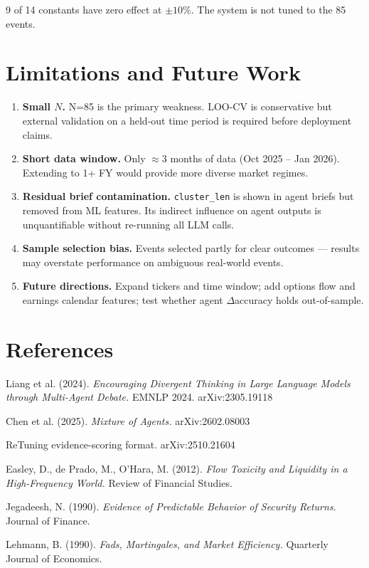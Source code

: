 \documentclass[11pt, a4paper]{article}
\begin{document}
9 of 14 constants have zero effect at $\pm10\%$. The system is not tuned to the 85 events.

\section{Limitations and Future Work}

\begin{enumerate}[leftmargin=1.5em, itemsep=3pt]
    \item \textbf{Small $N$.} N=85 is the primary weakness. LOO-CV is conservative but external validation on a held-out time period is required before deployment claims.
    \item \textbf{Short data window.} Only $\approx$3 months of data (Oct 2025 -- Jan 2026). Extending to 1+ FY would provide more diverse market regimes.
    \item \textbf{Residual brief contamination.} \texttt{cluster\_len} is shown in agent briefs but removed from ML features. Its indirect influence on agent outputs is unquantifiable without re-running all LLM calls.
    \item \textbf{Sample selection bias.} Events selected partly for clear outcomes — results may overstate performance on ambiguous real-world events.
    \item \textbf{Future directions.} Expand tickers and time window; add options flow and earnings calendar features; test whether agent $\Delta$accuracy holds out-of-sample.
\end{enumerate}

\section*{References}

\begin{enumerate}[leftmargin=1.5em, itemsep=3pt, label={[\arabic*]}]
    \item Liang et al. (2024). \textit{Encouraging Divergent Thinking in Large Language Models through Multi-Agent Debate.} EMNLP 2024. arXiv:2305.19118
    \item Chen et al. (2025). \textit{Mixture of Agents.} arXiv:2602.08003
    \item ReTuning evidence-scoring format. arXiv:2510.21604
    \item Easley, D., de Prado, M., O'Hara, M. (2012). \textit{Flow Toxicity and Liquidity in a High-Frequency World.} Review of Financial Studies.
    \item Jegadeesh, N. (1990). \textit{Evidence of Predictable Behavior of Security Returns.} Journal of Finance.
    \item Lehmann, B. (1990). \textit{Fads, Martingales, and Market Efficiency.} Quarterly Journal of Economics.
\end{enumerate}
\end{document}

